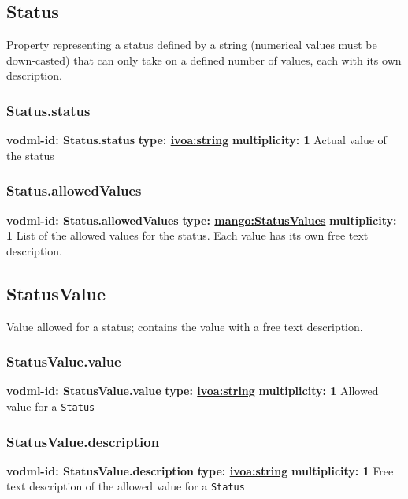   \subsection{Status}
  \label{sect:Status}
    Property representing a status defined by a string (numerical values must be down-casted) that can only take on a defined number of values, each with its own description.

    \subsubsection{Status.status}
      \textbf{vodml-id: Status.status} \newline
      \textbf{type: \hyperref[sect:ivoa]{ivoa:string}} \newline
      \textbf{multiplicity: 1} \newline
      Actual value of the status

    \subsubsection{Status.allowedValues}
      \textbf{vodml-id: Status.allowedValues} \newline
      \textbf{type: \hyperref[sect:StatusValues]{mango:StatusValues}} \newline
      \textbf{multiplicity: 1} \newline
      List of the allowed values for the status. Each value has its own free text description.

  \subsection{StatusValue}
  \label{sect:StatusValue}
    Value allowed for a status; contains the value with a free text description.

    \subsubsection{StatusValue.value}
      \textbf{vodml-id: StatusValue.value} \newline
      \textbf{type: \hyperref[sect:ivoa]{ivoa:string}} \newline
      \textbf{multiplicity: 1} \newline
      Allowed value for a \texttt{Status}

    \subsubsection{StatusValue.description}
      \textbf{vodml-id: StatusValue.description} \newline
      \textbf{type: \hyperref[sect:ivoa]{ivoa:string}} \newline
      \textbf{multiplicity: 1} \newline
      Free text description of the allowed value for a \texttt{Status}

